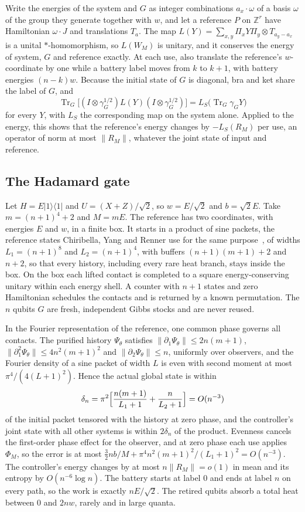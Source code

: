 \documentclass[11pt]{article}
\theoremstyle{definition}
\theoremstyle{remark}
\newcommand{\Tr}{\operatorname{Tr}}
\begin{document}
Write the energies of the system and $G$ as integer combinations $a_x\cdot\omega$ of a basis $\omega$ of the group they generate together with $w$, and let a reference $P$ on $\mathbb Z^r$ have Hamiltonian $\omega\cdot J$ and translations $T_a$. The map $L(Y)=\sum_{x,y}\Pi_xY\Pi_y\otimes T_{a_y-a_x}$ is a unital $*$-homomorphism, so $L(W_M)$ is unitary, and it conserves the energy of system, $G$ and reference exactly. At each use, also translate the reference's $w$-coordinate by one while a battery label moves from $k$ to $k+1$, with battery energies $(n-k)w$. Because the initial state of $G$ is diagonal, bra and ket share the label of $G$, and
\[
\Tr_G\bigl[(I\otimes\gamma_G^{1/2})L(Y)(I\otimes\gamma_G^{1/2})\bigr]=L_S\bigl(\Tr_G\gamma_GY\bigr)
\]
for every $Y$, with $L_S$ the corresponding map on the system alone. Applied to the energy, this shows that the reference's energy changes by $-L_S(R_M)$ per use, an operator of norm at most $\|R_M\|$, whatever the joint state of input and reference.

\subsection{The Hadamard gate}

Let $H=E|1\rangle\langle1|$ and $U=(X+Z)/\sqrt2$, so $w=E/\sqrt2$ and $b=\sqrt2E$. Take $m=(n+1)^4+2$ and $M=mE$. The reference has two coordinates, with energies $E$ and $w$, in a finite box. It starts in a product of sine packets, the reference states Chiribella, Yang and Renner use for the same purpose~\cite{ChiribellaYangRenner21}, of widths $L_1=(n+1)^8$ and $L_2=(n+1)^4$, with buffers $(n+1)(m+1)+2$ and $n+2$, so that every history, including every rare heat branch, stays inside the box. On the box each lifted contact is completed to a square energy-conserving unitary within each energy shell. A counter with $n+1$ states and zero Hamiltonian schedules the contacts and is returned by a known permutation. The $n$ qubits $G$ are fresh, independent Gibbs stocks and are never reused.

In the Fourier representation of the reference, one common phase governs all contacts. The purified history $\Psi_\theta$ satisfies $\|\partial_1\Psi_\theta\|\le2n(m+1)$, $\|\partial_1^2\Psi_\theta\|\le4n^2(m+1)^2$ and $\|\partial_2\Psi_\theta\|\le n$, uniformly over observers, and the Fourier density of a sine packet of width $L$ is even with second moment at most $\pi^4/(4(L+1)^2)$. Hence the actual global state is within
\[
\delta_n=\pi^2\Bigl[\frac{n(m+1)}{L_1+1}+\frac n{L_2+1}\Bigr]=O(n^{-3})
\]
of the initial packet tensored with the history at zero phase, and the controller's joint state with all other systems is within $2\delta_n$ of the product. Evenness cancels the first-order phase effect for the observer, and at zero phase each use applies $\Phi_M$, so the error is at most $\frac32nb/M+\pi^4n^2(m+1)^2/(L_1+1)^2=O(n^{-3})$. The controller's energy changes by at most $n\|R_M\|=o(1)$ in mean and its entropy by $O(n^{-6}\log n)$. The battery starts at label $0$ and ends at label $n$ on every path, so the work is exactly $nE/\sqrt2$. The retired qubits absorb a total heat between $0$ and $2nw$, rarely and in large quanta.
\end{document}
